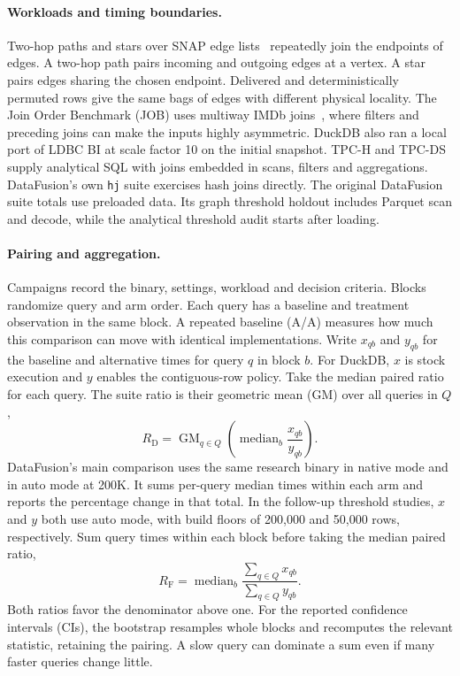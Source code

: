 \documentclass[11pt,a4paper]{article}
\begin{document}
\paragraph{Workloads and timing boundaries.}
Two-hop paths and stars over SNAP edge lists~\cite{snap} repeatedly join the endpoints of edges. A
two-hop path pairs incoming and outgoing edges at a vertex. A star pairs edges sharing the chosen
endpoint. Delivered and deterministically permuted rows give the same bags of edges with different
physical locality. The Join Order Benchmark (JOB) uses multiway IMDb joins~\cite{leis}, where
filters and preceding joins can make the inputs highly asymmetric. DuckDB also ran a local port of
LDBC BI at scale factor 10 on the initial snapshot. TPC-H and TPC-DS supply analytical SQL with
joins embedded in scans, filters and aggregations. DataFusion's own \texttt{hj} suite exercises
hash joins directly. The original DataFusion suite totals use preloaded data. Its graph threshold
holdout includes Parquet scan and decode, while the analytical threshold audit starts after
loading.

\paragraph{Pairing and aggregation.}
Campaigns record the binary, settings, workload and decision criteria. Blocks randomize query and
arm order. Each query has a baseline and treatment observation in the same block. A repeated
baseline (A/A) measures how much this comparison can move with identical implementations.
Write $x_{qb}$ and $y_{qb}$ for the baseline and alternative times for query $q$ in block $b$.
For DuckDB, $x$ is stock execution and $y$ enables the contiguous-row policy. Take the median
paired ratio for each query. The suite ratio is their geometric mean (GM) over all queries in $Q$,
\begin{equation}
 R_{\mathrm{D}}=\operatorname{GM}_{q\in Q}
 \left(\operatorname{median}_b\frac{x_{qb}}{y_{qb}}\right).
 \label{eq:duckstat}
\end{equation}
DataFusion's main comparison uses the same research binary in native mode and in auto mode at
200K. It sums per-query median times within each arm and reports the percentage change in that
total. In the follow-up threshold studies, $x$ and $y$ both use auto mode,
with build floors of 200,000 and 50,000 rows, respectively. Sum query times within each
block before taking the median paired ratio,
\begin{equation}
 R_{\mathrm{F}}=\operatorname{median}_b
 \frac{\sum_{q\in Q}x_{qb}}{\sum_{q\in Q}y_{qb}}.
 \label{eq:dfstat}
\end{equation}
Both ratios favor the denominator above one. For the reported confidence intervals (CIs), the
bootstrap resamples whole blocks and recomputes the relevant statistic, retaining the pairing. A
slow query can dominate a sum even if many faster queries change little.
\end{document}
